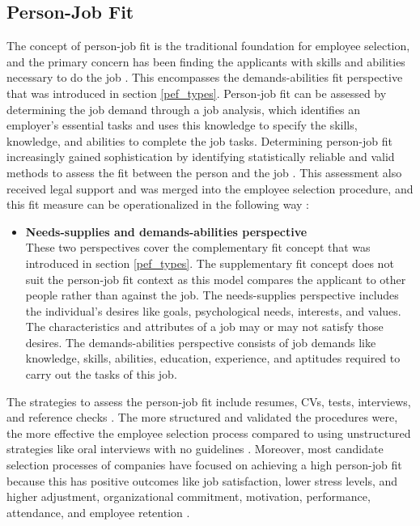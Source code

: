 \documentclass[draft,final]{thesisclass} %
\begin{document}
\subsection{Person-Job Fit}
The concept of person-job fit is the traditional foundation for employee selection, and the primary concern has been finding the applicants with skills and abilities necessary to do the job \parencite[183]{po_and_pj_fit_literature_review}.
This encompasses the demands-abilities fit perspective that was introduced in section \ref{pef_types}.
Person-job fit can be assessed by determining the job demand through a job analysis, which identifies an employer's essential tasks and uses this knowledge to specify the skills, knowledge, and abilities to complete the job tasks.
Determining person-job fit increasingly gained sophistication by identifying statistically reliable and valid methods to assess the fit between the person and the job \parencite[183]{po_and_pj_fit_literature_review}.
This assessment also received legal support and was merged into the employee selection procedure, and this fit measure can be operationalized in the following way \parencite[183-184]{po_and_pj_fit_literature_review}:
\begin{itemize}
    \item \textbf{Needs-supplies and demands-abilities perspective}\\
    These two perspectives cover the complementary fit concept that was introduced in section \ref{pef_types}.
    The supplementary fit concept does not suit the person-job fit context as this model compares the applicant to other people rather than against the job.
    The needs-supplies perspective includes the individual's desires like goals, psychological needs, interests, and values. The characteristics and attributes of a job may or may not satisfy those desires.
    The demands-abilities perspective consists of job demands like knowledge, skills, abilities, education, experience, and aptitudes required to carry out the tasks of this job.
\end{itemize}
The strategies to assess the person-job fit include resumes, \acs{CV}s, tests, interviews, and reference checks \parencite[184]{po_and_pj_fit_literature_review}.
The more structured and validated the procedures were, the more effective the employee selection process compared to using unstructured strategies like oral interviews with no guidelines \parencite[184]{po_and_pj_fit_literature_review}.
Moreover, most candidate selection processes of companies have focused on achieving a high person-job fit because this has positive outcomes like job satisfaction, lower stress levels, and higher adjustment, organizational commitment, motivation, performance, attendance, and employee retention \parencite[184]{po_and_pj_fit_literature_review}.
\end{document}
